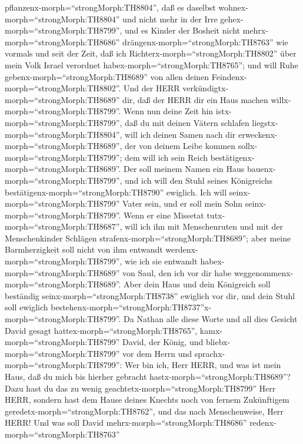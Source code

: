 pflanzenx-morph=``strongMorph:TH8804'', daß es daselbst
wohnex-morph=``strongMorph:TH8804'' und nicht mehr in der Irre
gehex-morph=``strongMorph:TH8799'', und es Kinder der Bosheit nicht
mehrx-morph=``strongMorph:TH8686'' drängenx-morph=``strongMorph:TH8763''
wie vormals und seit der Zeit, daß ich
Richterx-morph=``strongMorph:TH8802'' über mein Volk Israel verordnet
habex-morph=``strongMorph:TH8765'';  und will Ruhe
gebenx-morph=``strongMorph:TH8689'' von allen deinen
Feindenx-morph=``strongMorph:TH8802''. Und der HERR
verkündigtx-morph=``strongMorph:TH8689'' dir, daß der HERR dir ein Haus
machen willx-morph=``strongMorph:TH8799''.  Wenn nun deine
Zeit hin istx-morph=``strongMorph:TH8799'', daß du mit deinen Vätern
schlafen liegstx-morph=``strongMorph:TH8804'', will ich deinen Samen
nach dir erweckenx-morph=``strongMorph:TH8689'', der von deinem Leibe
kommen sollx-morph=``strongMorph:TH8799''; dem will ich sein Reich
bestätigenx-morph=``strongMorph:TH8689''.  Der soll meinem
Namen ein Haus bauenx-morph=``strongMorph:TH8799'', und ich will den
Stuhl seines Königreichs bestätigenx-morph=``strongMorph:TH8790''
ewiglich.  Ich will seinx-morph=``strongMorph:TH8799''
Vater sein, und er soll mein Sohn seinx-morph=``strongMorph:TH8799''.
Wenn er eine Missetat tutx-morph=``strongMorph:TH8687'', will ich ihn
mit Menschenruten und mit der Menschenkinder Schlägen
strafenx-morph=``strongMorph:TH8689'';  aber meine
Barmherzigkeit soll nicht von ihm entwandt
werdenx-morph=``strongMorph:TH8799'', wie ich sie entwandt
habex-morph=``strongMorph:TH8689'' von Saul, den ich vor dir habe
weggenommenx-morph=``strongMorph:TH8689''.  Aber dein Haus
und dein Königreich soll beständig seinx-morph=``strongMorph:TH8738''
ewiglich vor dir, und dein Stuhl soll ewiglich
bestehenx-morph=``strongMorph:TH8737''x-morph=``strongMorph:TH8799''.
 Da Nathan alle diese Worte und all dies Gesicht David
gesagt hattex-morph=``strongMorph:TH8765'', 
kamx-morph=``strongMorph:TH8799'' David, der König, und
bliebx-morph=``strongMorph:TH8799'' vor dem Herrn und
sprachx-morph=``strongMorph:TH8799'': Wer bin ich, Herr HERR, und was
ist mein Haus, daß du mich bis hierher gebracht
hastx-morph=``strongMorph:TH8689''?  Dazu hast du das zu
wenig geachtetx-morph=``strongMorph:TH8799'' Herr HERR, sondern hast dem
Hause deines Knechts noch von fernem Zukünftigem
geredetx-morph=``strongMorph:TH8762'', und das nach Menschenweise, Herr
HERR!  Und was soll David
mehrx-morph=``strongMorph:TH8686'' redenx-morph=``strongMorph:TH8763''
